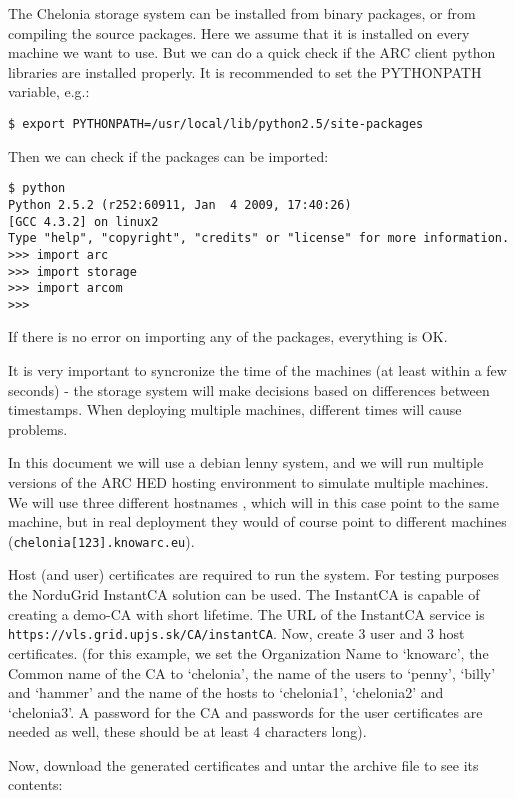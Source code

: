 \documentclass{article}
\begin{document}
The Chelonia storage system can be installed from binary packages, or from compiling the source packages. Here we assume that it is installed on every machine we want to use. But we can do a quick check if the ARC client python libraries are installed properly. It is recommended to set the PYTHONPATH variable, e.g.:

\begin{verbatim}
$ export PYTHONPATH=/usr/local/lib/python2.5/site-packages
\end{verbatim}

Then we can check if the packages can be imported:

\begin{verbatim}
$ python
Python 2.5.2 (r252:60911, Jan  4 2009, 17:40:26) 
[GCC 4.3.2] on linux2
Type "help", "copyright", "credits" or "license" for more information.
>>> import arc
>>> import storage
>>> import arcom
>>> 
\end{verbatim}

If there is no error on importing any of the packages, everything is OK. 

It is very important to syncronize the time of the machines (at least within a few seconds) - the storage system will make decisions based on differences between timestamps. When deploying multiple machines, different times will cause problems.

In this document we will use a debian lenny system, and we will run multiple versions of the ARC HED hosting environment to simulate multiple machines. We will use three different hostnames , which will in this case point to the same machine, but in real deployment they would of course point to different machines (\verb!chelonia[123].knowarc.eu!).

Host (and user) certificates are required to run the system. For testing purposes the NorduGrid InstantCA solution can be used. The InstantCA is capable of creating a demo-CA with short lifetime. The URL of the InstantCA service is \verb!https://vls.grid.upjs.sk/CA/instantCA!. Now, create 3 user and 3 host certificates. (for this example, we set the Organization Name to `knowarc', the Common name of the CA to `chelonia', the name of the users to `penny', `billy' and `hammer' and the name of the hosts to `chelonia1', `chelonia2' and `chelonia3'. A password for the CA and passwords for the user certificates are needed as well, these should be at least 4 characters long).

Now, download the generated certificates and untar the archive file to see its contents:
\end{document}
